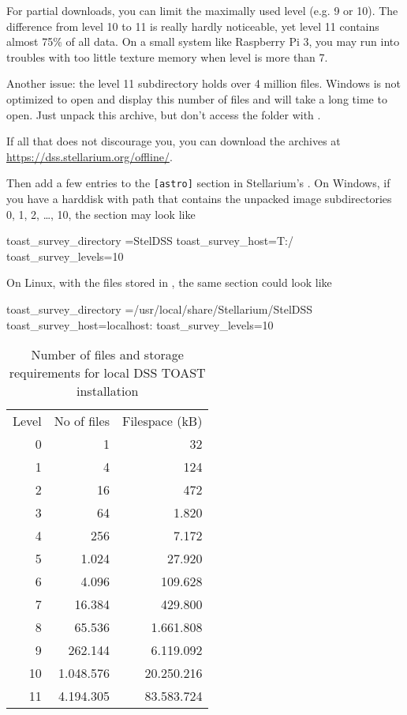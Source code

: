 For partial downloads, you can limit the maximally used level (e.g. 9
or 10). The difference from level 10 to 11 is really hardly
noticeable, yet level 11 contains almost 75\% of all data. On a small
system like Raspberry Pi 3, you may run into troubles with too little
texture memory when level is more than 7.

Another issue: the level 11 subdirectory holds over 4 million
files. Windows  is not optimized to open and display
this number of files and will take a long time to open. Just unpack
this archive, but don't access the folder with .

If all that does not discourage you, you can download the archives at
\url{https://dss.stellarium.org/offline/}.

Then add a few entries to the \texttt{[astro]} section in
Stellarium's .  On Windows, if you have a harddisk
 with path  that contains the
unpacked image subdirectories 0, 1, 2, \ldots, 10, the section may look like
\begin{configfile}
[astro]
toast_survey_directory =StelDSS
toast_survey_host=T:/
toast_survey_levels=10
\end{configfile}
On Linux, with the files stored in , the same section could look like
\begin{configfile}
[astro]
toast_survey_directory =/usr/local/share/Stellarium/StelDSS
toast_survey_host=localhost:
toast_survey_levels=10
\end{configfile}

\begin{table}[htbp]
  \centering
\begin{tabular}{rrr}
Level & No of files & Filespace (kB)\\
0     &          1  &         32\\
1     &          4  &        124\\
2     &         16  &        472\\
3     &         64  &      1.820\\
4     &        256  &      7.172\\
5     &      1.024  &     27.920\\
6     &      4.096  &    109.628\\
7     &     16.384  &    429.800\\
8     &     65.536  &  1.661.808\\
9     &    262.144  &  6.119.092\\
10    &  1.048.576  & 20.250.216\\
11    &  4.194.305  & 83.583.724
\end{tabular}
\caption{Number of files and storage requirements for local DSS TOAST installation}
\label{tab:TOAST:levels}
\end{table}




